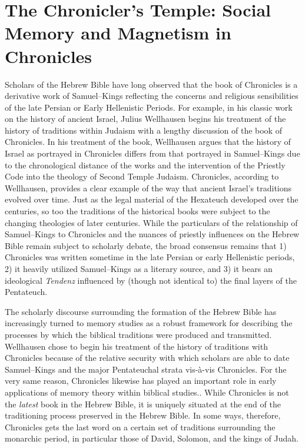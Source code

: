 \chapter{The Chronicler's Temple: Social Memory and Magnetism in
Chronicles}\label{the-chroniclers-temple-social-memory-and-magnetism-in-chronicles}

Scholars of the Hebrew Bible have long observed that the book of
Chronicles is a derivative work of Samuel--Kings reflecting the concerns
and religious sensibilities of the late Persian or Early Hellenistic
Periods. For example, in his classic work on the history of ancient
Israel, Julius Wellhausen begins his treatment of the history of
traditions within Judaism with a lengthy discussion of the book of
Chronicles. In his treatment of the book, Wellhausen argues that the
history of Israel as portrayed in Chronicles differs from that portrayed
in Samuel--Kings due to the chronological distance of the works and the
intervention of the Priestly Code into the theology of Second Temple
Judaism.\autocites[171--172]{wellhausen1957}[See
also][]{wright_ulrich-wright1992} Chronicles, according to Wellhausen,
provides a clear example of the way that ancient Israel's traditions
evolved over time. Just as the legal material of the Hexateuch developed
over the centuries, so too the traditions of the historical books were
subject to the changing theologies of later centuries. While the
particulars of the relationship of Samuel--Kings to Chronicles and the
nuances of priestly influences on the Hebrew Bible remain subject to
scholarly debate, the broad consensus remains that 1) Chronicles was
written sometime in the late Persian or early Hellenistic periods, 2) it
heavily utilized Samuel--Kings as a literary source, and 3) it bears an
ideological \emph{Tendenz} influenced by (though not identical to) the
final layers of the Pentateuch.\autocites[For a thorough and reasonably
recent summary of the \emph{status questionis},
see][72--89]{knoppers2003}[See
also][]{japhet1993}{japhet2009}{braun1986}[and][]{coggins1976}

The scholarly discourse surrounding the formation of the Hebrew Bible
has increasingly turned to memory studies as a robust framework for
describing the processes by which the biblical traditions were produced
and
transmitted.\autocites{wright2014}{blenkinsopp2013}{rogerson2010}{davies2008}{hendel2005}{smith_cbq2002}
Wellhausen chose to begin his treatment of the history of traditions
with Chronicles because of the relative security with which scholars are
able to date Samuel--Kings and the major Pentateuchal strata vis-à-vis
Chronicles. For the very same reason, Chronicles likewise has played an
important role in early applications of memory theory within biblical
studies.\autocites{benzvi_st2017}{benzvi-a_evans-williams2013}{benzvi-b_evans-williams2013}.
While Chronicles is not the \emph{latest} book in the Hebrew Bible, it
is uniquely situated at the end of the traditioning process preserved in
the Hebrew Bible. In some ways, therefore, Chronicles gets the last word
on a certain set of traditions surrounding the monarchic period, in
particular those of David, Solomon, and the kings of Judah.

